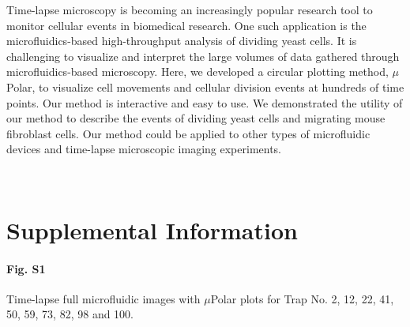 \documentclass[conference]{IEEEtran}
\begin{document}

 

Time-lapse microscopy is becoming an increasingly popular research tool to monitor cellular events in biomedical research. One such application is the microfluidics-based high-throughput analysis of dividing yeast cells. It is challenging to visualize and interpret the large volumes of data gathered through microfluidics-based microscopy. Here, we developed a circular plotting method, $\mu$Polar, to visualize cell movements and cellular division events at hundreds of time points. Our method is interactive and easy to use. We demonstrated the utility of our method to describe the events of dividing yeast cells and migrating mouse fibroblast cells. Our method could be applied to other types of microfluidic devices and time-lapse microscopic imaging experiments.

\
\section{Supplemental Information}

\paragraph*{Fig. S1}
\label{Fig_S1}
{
Time-lapse full microfluidic images with $\mu$Polar plots for Trap No. 2, 12, 22, 41, 50, 59, 73, 82, 98 and 100}. 
\end{document}
